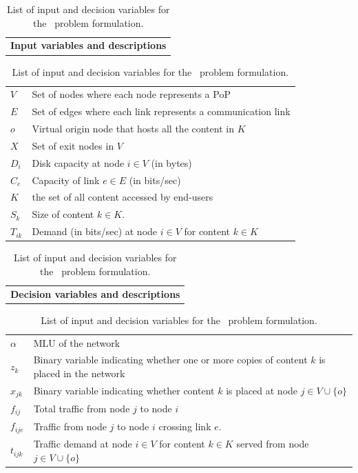 \begin{table}[t]
\begin{small}
\begin{tabular}{|p{3.15in}|} 
 \hline
\textbf{Input variables and descriptions}\\ 
\end{tabular}
\begin{tabular}{|p{0.2in}|p{2.8in}|}
\hline
  $V$ & Set of nodes where each node represents a PoP   \\
  $E$ & Set of edges where each link represents a communication link   \\
   $o$ & Virtual origin node that hosts all the content in $K$  \\ 
  $ X$ & Set of exit nodes in $V$ \\ 
  $D_i$ & Disk capacity at node $i \in V$ (in bytes) \\
  $C_e$ & Capacity of link $e \in E$ (in bits/sec)\\
  $K$ & the set of all content accessed by end-users \\
   $S_k$ & Size of content $k \in K$.   \\
   $T_{ik}$ & Demand (in bits/sec)  at  node $i \in V$ for content $k \in K$ \\
   \hline
   \end{tabular}
\begin{tabular}{|p{3.15in}|}
  \hline
\textbf{Decision variables and descriptions}\\ 
\end{tabular}
\begin{tabular}{|p{0.2in}|p{2.8in}|}
\hline
$\alpha$ & MLU of the network \\
$z_k$ & Binary variable indicating whether one or more copies of content $k$ is placed in the network\\
$x_{jk}$ & Binary variable indicating whether content $k$  is placed at node $j \in V \cup \{o\}$\\
$f_{ij}$ & Total traffic from node $j$ to node $i$\\
$f_{ije}$ & Traffic from node $j$ to node $i$ crossing link $e$.\\
$t_{ijk}$ & Traffic demand at node $i \in V$ for content $k\in K$ served from node $j \in V \cup \{o\}$ \\\hline
\end{tabular}
\label{table:paramtable}
\end{small}

\caption{List of input  and decision variables for the \ncp\ problem formulation.}
\vspace{-0.2in}
\end{table}

